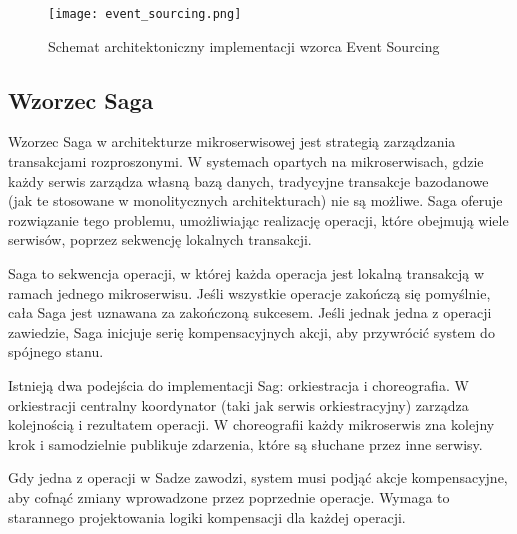 \begin{figure}[!h]
    \centering \texttt{[image: event\_sourcing.png]}
    \caption{Schemat architektoniczny implementacji wzorca Event Sourcing}
\end{figure}

\subsection{Wzorzec Saga}

Wzorzec Saga \cite{saga} w architekturze mikroserwisowej jest strategią zarządzania transakcjami rozproszonymi. W systemach opartych na mikroserwisach, gdzie każdy serwis zarządza własną bazą danych, tradycyjne transakcje bazodanowe (jak te stosowane w monolitycznych architekturach) nie są możliwe. Saga oferuje rozwiązanie tego problemu, umożliwiając realizację operacji, które obejmują wiele serwisów, poprzez sekwencję lokalnych transakcji.

Saga to sekwencja operacji, w której każda operacja jest lokalną transakcją w ramach jednego mikroserwisu. Jeśli wszystkie operacje zakończą się pomyślnie, cała Saga jest uznawana za zakończoną sukcesem. Jeśli jednak jedna z operacji zawiedzie, Saga inicjuje serię kompensacyjnych akcji, aby przywrócić system do spójnego stanu.

Istnieją dwa podejścia do implementacji Sag: orkiestracja i choreografia. W orkiestracji centralny koordynator (taki jak serwis orkiestracyjny) zarządza kolejnością i rezultatem operacji. W choreografii każdy mikroserwis zna kolejny krok i samodzielnie publikuje zdarzenia, które są słuchane przez inne serwisy.

Gdy jedna z operacji w Sadze zawodzi, system musi podjąć akcje kompensacyjne, aby cofnąć zmiany wprowadzone przez poprzednie operacje. Wymaga to starannego projektowania logiki kompensacji dla każdej operacji.
